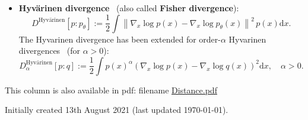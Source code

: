 \documentclass[11pt]{article}
\begin{document}
\begin{itemize}
	\item {\bf Hyv\"arinen divergence}~\cite{} (also called {\bf Fisher divergence}):
	$$
	D^{\mbox{Hyv\"arinen}}\left[p: p_{\theta}\right]:=\frac{1}{2} \int\left\|\nabla_{x} \log p(x)-\nabla_{x} \log p_{\theta}(x)\right\|^{2}\, p(x) \mathrm{d} x.
	$$
	The Hyvarinen divergence has been extended for order-$\alpha$ Hyvarinen divergences~\cite{nielsen2021fast} (for $\alpha>0$):
	$$
	D^{\mbox{Hyv\"arinen}}_{\alpha}[p: q]:=\frac{1}{2} \int p(x)^{\alpha} \left(\nabla_{x} \log p(x)-\nabla_{x} \log q(x)\right)^{2} \mathrm{d} x, \quad \alpha>0 .
	$$
	
\end{itemize}

\vskip 0.5cm
This column is also available in pdf: filename \url{Distance.pdf} 
\vskip 0.5cm


\vskip 1cm
Initially created 13th August 2021 (last updated \today).



\end{document}
